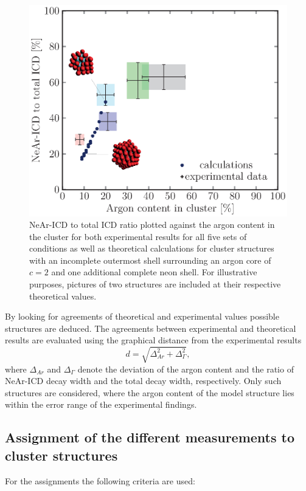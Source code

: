 \begin{figure}[!h]
  \centering
  \includegraphics[scale=0.75]{pics/incompl01_02_mit_inlays.eps}
  \caption{NeAr-ICD to total ICD ratio plotted against the argon content
           in the cluster for both experimental results for all five sets of
           conditions as well as theoretical calculations for cluster structures
           with an incomplete outermost shell surrounding an argon core of
           $c=2$ and one additional complete neon shell. For illustrative purposes,
           pictures of two structures are included at their respective
           theoretical values.}
  \label{figure:incompl01_02_explain}
\end{figure}

By looking for agreements of theoretical and experimental values
possible structures are deduced.
The agreements between experimental and theoretical results are evaluated
using the graphical distance from the experimental results
\begin{equation}
  d = \sqrt{\Delta_{Ar}^2 + \Delta_{\Gamma}^2}    ,
\end{equation}
where $\Delta_{Ar}$ and $\Delta_{\Gamma}$ denote the deviation of the argon content
and the ratio of NeAr-ICD decay width and the total decay width, respectively.
Only such structures are considered, where the argon content of the model
structure lies within the error range of the experimental findings.


\subsection{Assignment of the different measurements to cluster structures}
For the assignments the following criteria are used:

